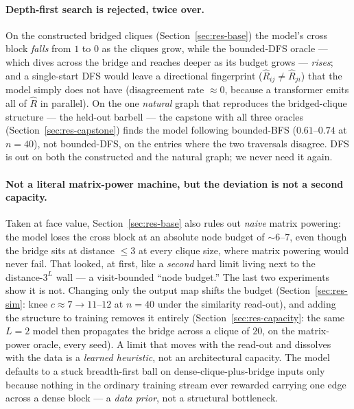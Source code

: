 \documentclass[11pt,a4paper]{article}
\begin{document}
\paragraph{Depth-first search is rejected, twice over.} On the constructed bridged cliques
(Section~\ref{sec:res-base}) the model's cross block \emph{falls} from $1$ to $0$ as the cliques
grow, while the bounded-DFS oracle --- which dives across the bridge and reaches deeper as its budget
grows --- \emph{rises}; and a single-start DFS would leave a directional fingerprint
($\hat R_{ij}\neq\hat R_{ji}$) that the model simply does not have (disagreement rate $\approx0$,
because a transformer emits all of $\hat R$ in parallel). On the one \emph{natural} graph that
reproduces the bridged-clique structure --- the held-out barbell --- the capstone with all three
oracles (Section~\ref{sec:res-capstone}) finds the model following bounded-BFS ($0.61$--$0.74$ at
$n=40$), not bounded-DFS, on the entries where the two traversals disagree. DFS is out on both the
constructed and the natural graph; we never need it again.

\paragraph{Not a literal matrix-power machine, but the deviation is not a second capacity.} Taken at
face value, Section~\ref{sec:res-base} also rules out \emph{naive} matrix powering: the model loses
the cross block at an absolute node budget of $\sim6$--$7$, even though the bridge sits at distance
$\le3$ at every clique size, where matrix powering would never fail. That looked, at first, like a
\emph{second} hard limit living next to the distance-$3^L$ wall --- a visit-bounded ``node budget.''
The last two experiments show it is not. Changing only the output map shifts the budget
(Section~\ref{sec:res-sim}: knee $c\approx7\to11$--$12$ at $n=40$ under the similarity read-out), and
adding the structure to training removes it entirely (Section~\ref{sec:res-capacity}: the same $L=2$
model then propagates the bridge across a clique of $20$, on the matrix-power oracle, every seed).
A limit that moves with the read-out and dissolves with the data is a \emph{learned heuristic}, not
an architectural capacity. The model defaults to a stuck breadth-first ball on dense-clique-plus-bridge
inputs only because nothing in the ordinary training stream ever rewarded carrying one edge across a
dense block --- a \emph{data prior}, not a structural bottleneck.
\end{document}
